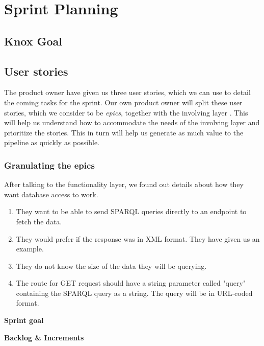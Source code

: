 \section{Sprint Planning}
\subsection{Knox Goal}
\subsection{User stories}
The \knox{} product owner have given us three user stories, which we can use to detail the coming tasks for the sprint.
Our own product owner will split these user stories, which we consider to be \textit{epics}, together with the involving layer \cite{Epics}.
This will help us understand how to accommodate the needs of the involving layer and prioritize the stories.\cite{UserStories}
This in turn will help us generate as much value to the pipeline as quickly as possible.


\subsubsection*{Granulating the epics}
After talking to the functionality layer, we found out details about how they want database access to work. 
\begin{enumerate}
    \item They want to be able to send SPARQL queries directly to an endpoint to fetch the data.
    \item They would prefer if the response was in XML format. They have given us an example.
    \item They do not know the size of the data they will be querying.
    \item The route for GET request should have a string parameter called "query" containing the SPARQL query as a string.
    The query will be in URL-coded format.
\end{enumerate}




\textbf{Sprint goal}


\textbf{Backlog \& Increments}

